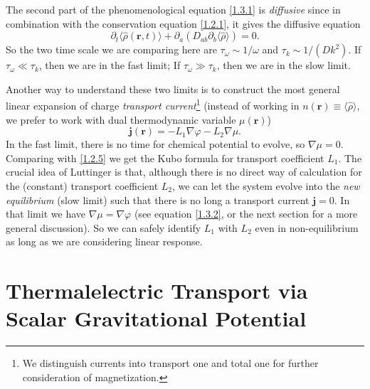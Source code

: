 \documentclass[10pt,nofootinbib,letterpaper]{revtex4}
\newcounter{Note}[section]
\newenvironment{Note}[1][]{{\par\normalfont\bfseries \underline{Note~\stepcounter{Note}\arabic{Note}.}~#1~~}}{\par}
\begin{document}
		\begin{Note}
			The second part of the phenomenological equation \eqref{1.3.1} is \emph{diffusive} since in combination with the conservation equation \eqref{1.2.1}, it gives the diffusive equation
			\begin{equation*}
				\partial_t\langle\hat\rho(\bm{r},t)\rangle+\partial_a(D_{ab}\partial_b \langle\hat\rho\rangle)=0.
			\end{equation*}
			So the two time scale we are comparing here are $\tau_\omega\sim 1/\omega$ and $\tau_k\sim1/(Dk^2)$. If $\tau_\omega\ll\tau_k$, then we are in the fast limit; If $\tau_\omega\gg\tau_k$, then we are in the slow limit.
		\end{Note}
		\begin{Note}
			Another way to understand these two limits is to construct the most general linear expansion of charge \emph{transport current}\footnote{We distinguish currents into transport one and total one for further consideration of magnetization.} (instead of working in $n(\bm{r})\equiv\langle\hat{\rho}\rangle$, we prefer to work with dual thermodynamic variable $\mu(\bm{r})$)
			\begin{equation}\label{1.3.6}
				\bm{j}(\bm{r})=-L_1\nabla\varphi-L_2\nabla\mu.
			\end{equation}
			In the fast limit, there is no time for chemical potential to evolve, so $\nabla\mu=0$. Comparing with \eqref{1.2.5} we get the Kubo formula for transport coefficient $L_1$. {\color{red}The crucial idea of Luttinger is that, although there is no direct way of calculation for the (constant) transport coefficient $L_2$, we can let the system evolve into the \emph{new equilibrium} (slow limit) such that there is no long a transport current $\bm{j}=0$. In that limit we have $\nabla\mu=\nabla\varphi$ (see equation \eqref{1.3.2}, or the next section for a more general discussion). So we can safely identify $L_1$ with $L_2$ even in non-equilibrium as long as we are considering linear response}.
		\end{Note}



\section{Thermalelectric Transport via Scalar Gravitational Potential}
\end{document}
